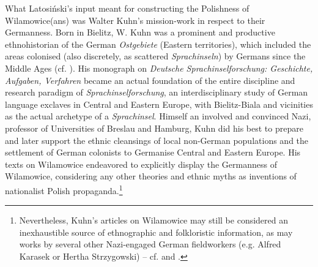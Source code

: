 \documentclass[output=paper]{langscibook}
\begin{document}
What Latosiński’s input meant for constructing the Polishness of Wilamowice(ans) was Walter Kuhn’s mission-work in respect to their Germanness. Born in Bielitz, W. Kuhn was a prominent and productive ethnohistorian of the German \textit{Ostgebiete} (Eastern territories), which included the areas colonised (also discretely, as scattered \textit{Sprachinseln}) by Germans since the Middle Ages (cf. \citealt[23ff]{wicherkiewicz_researching_2016}). His \citeyear{kuhn_deutsche_1934} monograph on \textit{Deutsche Sprachinselforschung: Geschichte, Aufgaben, Verfahren} became an actual foundation of the entire discipline and research paradigm of \textit{Sprachinselforschung}, an interdisciplinary study of German language exclaves in Central and Eastern Europe, with Bielitz-Biala and vicinities as the actual archetype of a \textit{Sprachinsel}. Himself an involved and convinced Nazi, professor of Universities of Breslau and Hamburg, Kuhn did his best to prepare and later support the ethnic cleansings of local non-German populations and the settlement of German colonists to Germanise Central and Eastern Europe. His texts on Wilamowice endeavored to explicitly display the Germanness of Wilamowice, considering any other theories and ethnic myths as inventions of nationalist Polish propaganda.\footnote{Nevertheless, Kuhn’s articles on Wilamowice may still be considered an inexhaustible source of ethnographic and folkloristic information, as may works by several other Nazi-engaged German fieldworkers (e.g. Alfred Karasek or Hertha Strzygowski) – cf. \citet{wicherkiewicz_researching_2016} and \citet{chromik_mikro_2019}.}
\end{document}
